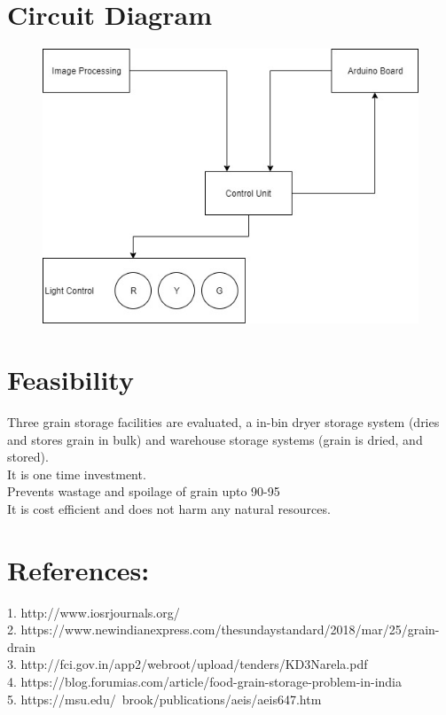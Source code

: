 \documentclass[]{article}
\begin{document}
\section*{Circuit Diagram}
\begin{figure}[!htb]
\begin{center}
\includegraphics[scale=.45]{2.jpg}
\end{center}
\end{figure}

\pagebreak
\section*{Feasibility}
Three grain storage facilities are evaluated, a in-bin dryer storage system (dries and stores grain in bulk) and warehouse storage systems (grain is dried, and stored).
\\
It is one time investment.
\\
Prevents wastage and spoilage of grain upto 90-95%
\\
It is cost efficient and does not harm any natural resources.


\section*{References:}
1.	http://www.iosrjournals.org/
\\
2.	https://www.newindianexpress.com/thesundaystandard/2018/mar/25/grain-drain
\\
3.	http://fci.gov.in/app2/webroot/upload/tenders/KD3Narela.pdf
\\
4.	https://blog.forumias.com/article/food-grain-storage-problem-in-india
\\
5.	https://msu.edu/~brook/publications/aeis/aeis647.htm 
\end{document}
